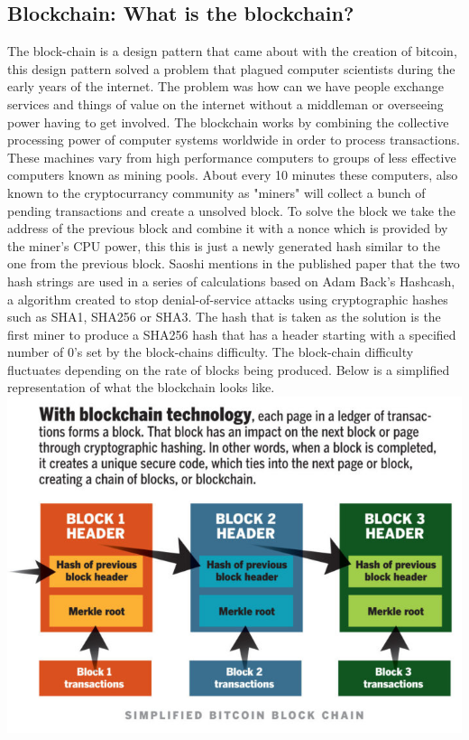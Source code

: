 \subsection{Blockchain: What is the blockchain?}
The block-chain is a design pattern that came about with the creation of bitcoin, this design pattern solved a problem that plagued computer scientists during the early years of the internet. The problem was how can we have people exchange services and things of value on the internet without a middleman or overseeing power having to get involved. The blockchain works by combining the collective processing power of computer systems worldwide in order to process transactions. These machines vary from high performance computers to groups of less effective computers known as mining pools. About every 10 minutes these computers, also known to the cryptocurrancy community as "miners" will collect a bunch of pending transactions and create a unsolved block. To solve the block we take the address of the previous block and combine it with a nonce which is provided by the miner’s CPU power, this this is just a newly generated hash similar to the one from the previous block. Saoshi mentions in the published paper that the two hash strings are used in a series of calculations based on Adam Back's Hashcash, a algorithm created to stop denial-of-service attacks using cryptographic hashes such as SHA1, SHA256 or SHA3. The hash that is taken as the solution is the first miner to produce a SHA256 hash that has a header starting with a specified number of 0’s set by the block-chains difficulty.  The block-chain difficulty fluctuates depending on the rate of blocks being produced. Below is a simplified representation of what the blockchain looks like.
\includegraphics[scale=0.5]{img/blockchaindesign.jpg}
